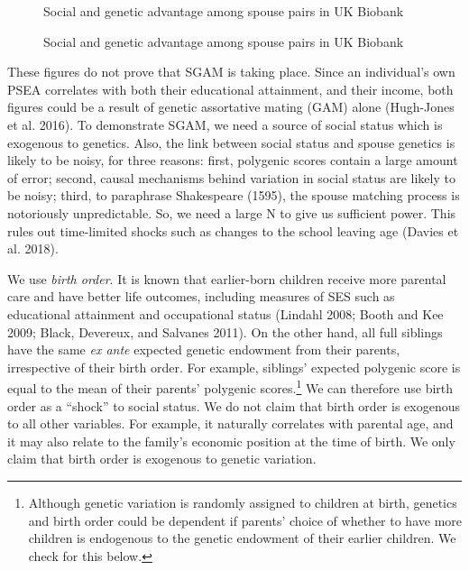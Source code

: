 \documentclass[
]{article}
\begin{document}
\begin{figure}
\caption{Social and genetic advantage among spouse pairs in UK Biobank}\label{fig:pic-basic-corr-uni}
\end{figure}

\begin{figure}
\caption{Social and genetic advantage among spouse pairs in UK Biobank}\label{fig:pic-basic-corr-income}
\end{figure}

These figures do not prove that SGAM is taking place. Since an
individual's own PSEA correlates with both their educational attainment,
and their income, both figures could be a result of genetic assortative
mating (GAM) alone (Hugh-Jones et al. 2016). To demonstrate SGAM, we need
a source of social status which is exogenous to genetics. Also, the link
between social status and spouse genetics is likely to be noisy, for
three reasons: first, polygenic scores contain a large amount of error;
second, causal mechanisms behind variation in social status are likely
to be noisy; third, to paraphrase Shakespeare (1595), the spouse
matching process is notoriously unpredictable. So, we need a large N to
give us sufficient power. This rules out time-limited shocks such as
changes to the school leaving age (Davies et al. 2018).

We use \emph{birth order}. It is known that earlier-born children receive
more parental care and have better life outcomes, including measures of
SES such as educational attainment and occupational status
(Lindahl 2008; Booth and Kee 2009; Black, Devereux, and Salvanes 2011). On the other hand,
all full siblings have the same \emph{ex ante} expected genetic endowment
from their parents, irrespective of their birth order. For example,
siblings' expected polygenic score is equal to the mean of their
parents' polygenic scores.\footnote{Although genetic variation is randomly assigned to children at
  birth, genetics and birth order could be dependent if parents'
  choice of whether to have more children is endogenous to the genetic
  endowment of their earlier children. We check for this below.} We can therefore use birth order as a
``shock'' to social status. We do not claim that birth order is exogenous
to all other variables. For example, it naturally correlates with
parental age, and it may also relate to the family's economic position
at the time of birth. We only claim that birth order is exogenous to
genetic variation.
\end{document}
